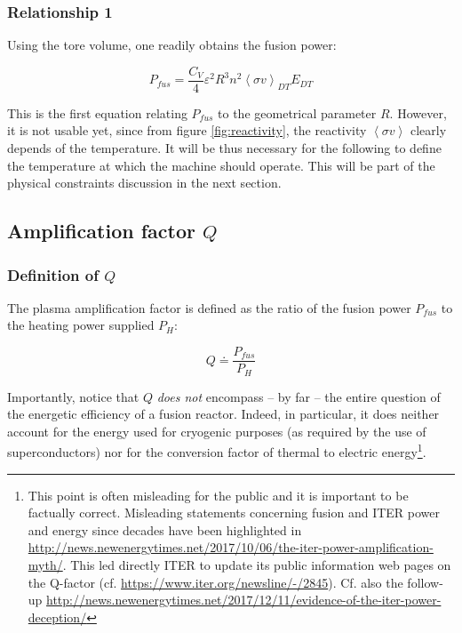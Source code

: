 \subsubsection{Relationship 1}
Using the tore volume, one readily obtains the fusion power:

\begin{equation}
\boxed{
  P_{fus} = \frac{C_V}{4}
  	\varepsilon^2 R^3
	n^2 \left< \sigma v \right>_{DT} E_{DT}
	\label{eq:FusionPower1}
}
\end{equation}

This is the first equation relating $P_{fus}$ to the geometrical parameter $R$. However, it is not usable yet, since from figure \ref{fig:reactivity}, the reactivity $\left< \sigma v \right>$ clearly depends of the temperature. It will be thus necessary for the following to define the temperature at which the machine should operate. This will be part of the physical constraints discussion in the next section. 

\subsection{Amplification factor $Q$}
\subsubsection{Definition of $Q$}
The plasma amplification factor is defined as the ratio of the fusion power $P_{fus}$ to the heating power supplied $P_{H}$\cite[p.12]{Wesson2004}:

\begin{equation}
Q \doteq \frac{P_{fus}}{P_{H}}
\label{eq:definition_Q}
\end{equation}

Importantly, notice that $Q$ \emph{does not} encompass -- by far -- the entire question of the energetic efficiency of a fusion reactor. Indeed, in particular, it does neither account for the energy used for cryogenic purposes (as required by the use of superconductors) nor for the conversion factor of thermal to electric energy\footnote{This point is often misleading for the public and it is important to be factually correct. Misleading statements concerning fusion and ITER power and energy since decades have been highlighted in \url{http://news.newenergytimes.net/2017/10/06/the-iter-power-amplification-myth/}. This led directly ITER to update its public information web pages on the Q-factor (cf. \url{https://www.iter.org/newsline/-/2845}).  Cf. also the follow-up \url{http://news.newenergytimes.net/2017/12/11/evidence-of-the-iter-power-deception/}}.


